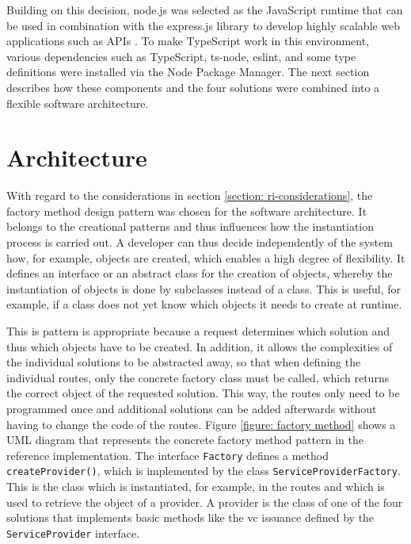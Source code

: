     Building on this decision, node.js was selected as the JavaScript runtime that can be used in combination with the express.js library to develop highly scalable web applications such as APIs \cite{openjs_foundation_about_2021, openjs_foundation_express_2021}. To make TypeScript work in this environment, various dependencies such as TypeScript, ts-node, eslint, and some type definitions were installed via the Node Package Manager. The next section describes how these components and the four solutions were combined into a flexible software architecture.
    
    \section{Architecture}\label{section: architecture}
    
    With regard to the considerations in section \ref{section: ri-considerations}, the factory method design pattern was chosen for the software architecture. It belongs to the creational patterns and thus influences how the instantiation process is carried out. A developer can thus decide independently of the system how, for example, objects are created, which enables a high degree of flexibility. It defines an interface or an abstract class for the creation of objects, whereby the instantiation of objects is done by subclasses instead of a class. This is useful, for example, if a class does not yet know which objects it needs to create at runtime. \cite[pp. 81, 85, 107-108]{gamma_design_1995} 
    
    This is pattern is appropriate because a request determines which solution and thus which objects have to be created. In addition, it allows the complexities of the individual solutions to be abstracted away, so that when defining the individual routes, only the concrete factory class must be called, which returns the correct object of the requested solution. This way, the routes only need to be programmed once and additional solutions can be added afterwards without having to change the code of the routes. Figure \ref{figure: factory method} shows a UML diagram that represents the concrete factory method pattern in the reference implementation. The interface \texttt{Factory} defines a method \texttt{createProvider()}, which is implemented by the class \texttt{ServiceProviderFactory}. This is the class which is instantiated, for example, in the routes and which is used to retrieve the object of a provider. A provider is the class of one of the four solutions that implements basic methods like the \ac{vc} issuance defined by the \texttt{ServiceProvider} interface.
    
